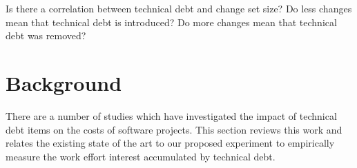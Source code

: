 \documentclass{mpaper}
\begin{document}
Is there a correlation between technical debt and change set size?
Do less changes mean that technical debt is introduced?
Do more changes mean that technical debt was removed? 



\section{Background}
\label{background}

There are a number of studies which have investigated the impact of technical
debt items on the costs of software projects.  This section reviews this work
and relates the existing state of the art to our proposed experiment to
empirically measure the work effort interest accumulated by technical debt.
\end{document}
